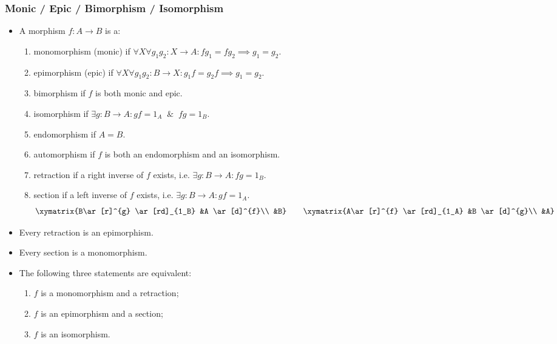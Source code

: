 \documentclass[UTF8,aspectratio=43,11pt,colorlinks,compress,openany]{beamer}%
\begin{document}
\begin{frame}\frametitle{Monic / Epic / Bimorphism / Isomorphism}
\begin{itemize}
	\item A morphism $f: A\to B$ is a:
\begin{enumerate}
	\item monomorphism (monic) if $\forall X\forall g_1g_2: X\to A: fg_1=fg_2\implies g_1=g_2$.
	\item epimorphism (epic) if $\forall X\forall g_1g_2: B\to X: g_1f=g_2f\implies g_1=g_2$.
	\item bimorphism if $f$ is both monic and epic.
	\item isomorphism if $\exists g: B\to A: gf=1_A\;\;\&\;\;fg=1_B$.
	\item endomorphism if $A=B$.
	\item automorphism if $f$ is both an endomorphism and an isomorphism.
	\item retraction if a right inverse of $f$ exists, i.e. $\exists g: B\to A: fg=1_B$.
	\item section if a left inverse of $f$ exists, i.e. $\exists g: B\to A: gf=1_A$.
	\vspace*{-1ex}
\[\xymatrix{B\ar[r]^{g} \ar[rd]_{1_B} &A \ar[d]^{f}\\
&B}
\qquad \xymatrix{A\ar[r]^{f} \ar[rd]_{1_A} &B \ar[d]^{g}\\
&A}
\]\vspace*{-2ex}
\end{enumerate}
	\item Every retraction is an epimorphism.
	\item Every section is a monomorphism.
	\item The following three statements are equivalent:
\begin{enumerate}
	\item $f$ is a monomorphism and a retraction;
	\item $f$ is an epimorphism and a section;
	\item $f$ is an isomorphism.
\end{enumerate}
\end{itemize}
\end{frame}
\end{document}
